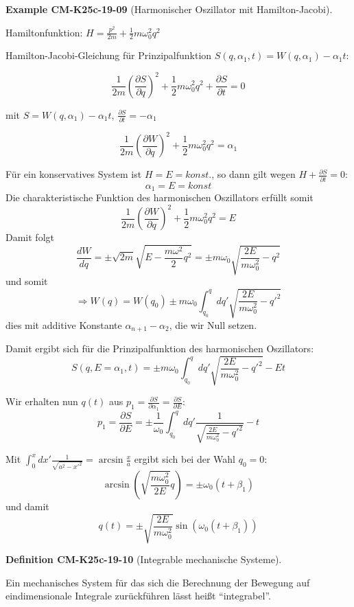 \documentclass[10pt, letterpaper]{article}
\newcommand{\CustomHeading}[3]{%
  \par\medskip\noindent%
  \textbf{#1 #2} \textnormal{(#3)}.\enskip%
}
\newenvironment{DEF}[2]{\CustomHeading{Definition}{#1}{#2}}{}
\newenvironment{EXA}[2]{\CustomHeading{Example}{#1}{#2}}{}
\begin{document}
\begin{EXA}{CM-K25c-19-09}{Harmonischer Oszillator mit Hamilton-Jacobi}
Hamiltonfunktion: $H = \frac{p^2}{2m} + \frac{1}{2}m\omega_0^2q^2$

Hamilton-Jacobi-Gleichung für Prinzipalfunktion $S(q,\alpha_1,t) = W(q,\alpha_1) - \alpha_1t$:

\[
\frac{1}{2m}\left(\frac{\partial S}{\partial q}\right)^2 + \frac{1}{2}m\omega_0^2q^2 + \frac{\partial S}{\partial t} = 0
\]

mit $S = W(q,\alpha_1) - \alpha_1t$, $\frac{\partial S}{\partial t} = -\alpha_1$

\[
\frac{1}{2m}\left(\frac{\partial W}{\partial q}\right)^2 + \frac{1}{2}m\omega_0^2q^2 = \alpha_1
\]

Für ein konservatives System ist $H = E = konst.$, so dann gilt wegen $H + \frac{\partial S}{\partial t} = 0$: 
$$\alpha_1 = E = konst$$
Die charakteristische Funktion des harmonischen Oszillators erfüllt somit
\[
\frac{1}{2m}\left(\frac{\partial W}{\partial q}\right)^2 + \frac{1}{2}m\omega_0^2q^2 = E
\]
Damit folgt
\[
\frac{dW}{dq} = \pm \sqrt{2m}\sqrt{E-\frac{m\omega^2}{2}q^2} = \pm m\omega_0\sqrt{\frac{2E}{m\omega_0^2}-q^2}
\]
und somit
\[
\Rightarrow W(q) = W(q_0) \pm m\omega_0 \int_{q_0}^q dq'\sqrt{\frac{2E}{m\omega_0^2}-q'^2}
\]
dies mit additive Konstante $\alpha_{n+1}-\alpha_2$, die wir Null setzen.

\noindent
Damit ergibt sich für die Prinzipalfunktion des harmonischen Oszillators:
\[
S(q,E=\alpha_1,t) = \pm m\omega_0\int_{q_0}^q dq'\sqrt{\frac{2E}{m\omega_0^2}-q'^2} - Et
\]

Wir erhalten nun $q(t)$ aus $p_1=\frac{\partial S}{\partial \alpha_1} = \frac{\partial S}{\partial E}$:
\[
p_1 = \frac{\partial S}{\partial E} = \pm \frac{1}{\omega_0}\int_{q_0}^q dq'\frac{1}{\sqrt{\frac{2E}{m\omega_0^2}-q'^2}} - t
\]

Mit $\int_0^x dx'\frac{1}{\sqrt{a^2-x'^2}} = \arcsin\frac{x}{a}$ ergibt sich bei der Wahl $q_0=0$:
\[
\arcsin\left(\sqrt{\frac{m\omega_0^2}{2E}}q\right) = \pm \omega_0(t+\beta_1)
\]
und damit
\[
q(t) = \pm \sqrt{\frac{2E}{m\omega_0^2}}\sin(\omega_0(t+\beta_1))
\]
\end{EXA}

\begin{DEF}{CM-K25c-19-10}{Integrable mechanische Systeme}
Ein mechanisches System für das sich die Berechnung der Bewegung auf eindimensionale Integrale zurückführen lässt heißt ``integrabel''.
\end{DEF}
\end{document}
